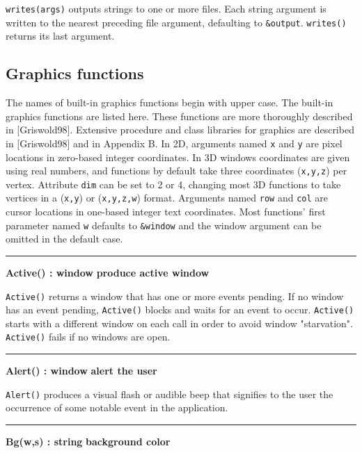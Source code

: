\noindent
\texttt{writes(args)} outputs strings to one or more files. Each string
argument is written to the nearest preceding file argument, defaulting
to \texttt{\&output}. \texttt{writes()} returns its
last argument.

\subsection*{Graphics functions}

The names of built-in graphics functions begin with upper case. The built-in
graphics functions are listed here. These functions are more thoroughly
described in [Griswold98]. Extensive procedure and class libraries for graphics
are described in [Griswold98] and in Appendix B.  In 2D, arguments named
\texttt{x} and \texttt{y} are pixel locations in zero-based integer
coordinates. In 3D windows coordinates are given using real numbers, and
functions by default take three coordinates (\texttt{x,y,z}) per
vertex. Attribute \texttt{dim} can be set to 2 or 4, changing most 3D functions
to take vertices in a (\texttt{x,y}) or (\texttt{x,y,z,w}) format. Arguments
named \texttt{row} and \texttt{col} are cursor locations in one-based integer
text coordinates. Most functions' first parameter named
\texttt{w} defaults to \texttt{\&window} and the window argument can be omitted
in the default case. 

\bigskip\hrule\vspace{0.1cm}
\noindent
{\bf Active() : window } \hfill {\bf produce active window}

\noindent
\texttt{Active()} returns a window that has one or more events pending.
If no window has an event pending, \texttt{Active()} blocks and waits
for an event to occur. \texttt{Active()} starts with a different
window on each call in order to avoid window
"starvation". \texttt{Active()} fails if
no windows are open.

\bigskip\hrule\vspace{0.1cm}
\noindent
{\bf Alert() : window } \hfill {\bf alert the user}

\noindent
\texttt{Alert()} produces a visual flash or audible beep that signifies
to the user the occurrence of some notable event in the application.

\bigskip\hrule\vspace{0.1cm}
\noindent
{\bf Bg(w,s) : string } \hfill {\bf background color}

